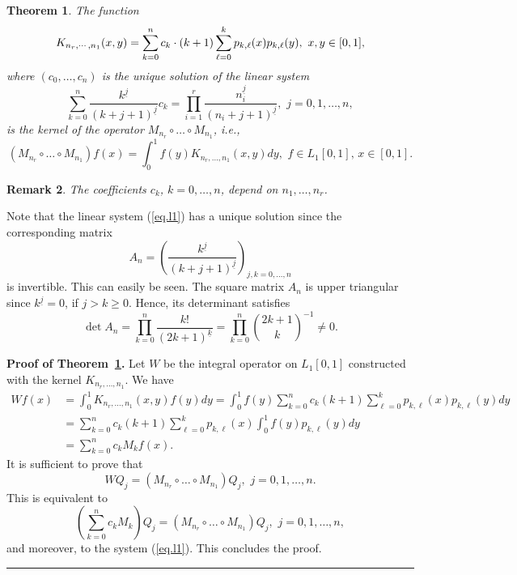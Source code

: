 \documentclass[12pt,reqno]{article}
\newtheorem{theorem}{Theorem}
\newtheorem{remark}[theorem]{Remark}
\newenvironment{proof}[1][Proof]{\noindent\textbf{#1.} }{\ \rule{0.5em}{0.5em}}
\begin{document}
\begin{theorem}
\label{THM4} The function 
\begin{equation*}
K_{n_r,\cdots,n_1}(x,y)=\displaystyle \sum_{k=0}^nc_k\cdot(k+1)\sum_{%
\ell=0}^kp_{k,\ell}(x)p_{k,\ell}(y),\, \, x,y\in[0,1],
\end{equation*}
where $(c_0,\dots,c_n)$ is the unique solution of the linear system 
\begin{equation}  \label{eq.l1}
\displaystyle \sum_{k=0}^n\dfrac{k^{\underline{j}}}{(k+j+1)^{\underline{j}}}%
c_k=\prod_{i=1}^r\dfrac{n_i^{\underline{j}}}{(n_i+j+1)^{\underline{j}}},\,
\, j=0,1,\dots,n,
\end{equation}
is the kernel of the operator $M_{n_r}\circ \dots \circ M_{n_1}$, i.e., 
\begin{equation*}
(M_{n_r}\circ \dots \circ
M_{n_1})f(x)=\int_0^1f(y)K_{n_r,\dots,n_1}(x,y)dy,\, \, f\in L_{1}[0,1],\,x%
\in[0,1].
\end{equation*}
\end{theorem}

\begin{remark}
The coefficients $c_{k}$, $k=0,\dots ,n$, depend on $n_{1},\dots ,n_{r}$.
\end{remark}

Note that the linear system (\ref{eq.l1}) has a unique solution since the
corresponding matrix 
\begin{equation}
A_{n}=\left( \frac{k^{\underline{j}}}{\left( k+j+1\right) ^{\underline{j}}}%
\right) _{j,k=0,\ldots ,n}  \label{eq.*}
\end{equation}%
is invertible. This can easily be seen. The square matrix $A_{n}$ is upper
triangular since $k^{\underline{j}}=0$, if $j>k\geq 0$. Hence, its
determinant satisfies 
\begin{equation*}
\det A_{n}=\prod_{k=0}^{n}\frac{k!}{\left( 2k+1\right) ^{\underline{k}}}%
=\prod_{k=0}^{n}\binom{2k+1}{k}^{-1}\neq 0.
\end{equation*}

\begin{proof}[Proof of Theorem~\protect\ref{THM4}]
Let $W$ be the integral operator on $L_{1}[0,1]$ constructed with the kernel 
$K_{n_{r},\dots ,n_{1}}$. We have 
\begin{align*}
Wf(x)& =\int_{0}^{1}K_{n_{r},\dots ,n_{1}}(x,y)f(y)dy=\displaystyle%
\int_{0}^{1}f(y)\sum_{k=0}^{n}c_{k}(k+1)\sum_{\ell =0}^{k}p_{k,\ell
}(x)p_{k,\ell }(y)dy \\
& =\displaystyle \sum_{k=0}^{n}c_{k}(k+1)\sum_{\ell =0}^{k}p_{k,\ell
}(x)\int_{0}^{1}f(y)p_{k,\ell }(y)dy \\
& =\sum_{k=0}^{n}c_{k}M_{k}f(x).
\end{align*}%
It is sufficient to prove that 
\begin{equation*}
WQ_{j}=(M_{n_{r}}\circ \dots \circ M_{n_{1}})Q_{j},\, \,j=0,1,\dots ,n.
\end{equation*}%
This is equivalent to 
\begin{equation*}
\left( \sum_{k=0}^{n}c_{k}M_{k}\right) Q_{j}=(M_{n_{r}}\circ \dots \circ
M_{n_{1}})Q_{j},\, \,j=0,1,\dots ,n,
\end{equation*}%
and moreover, to the system (\ref{eq.l1}). This concludes the proof.
\end{proof}
\end{document}
